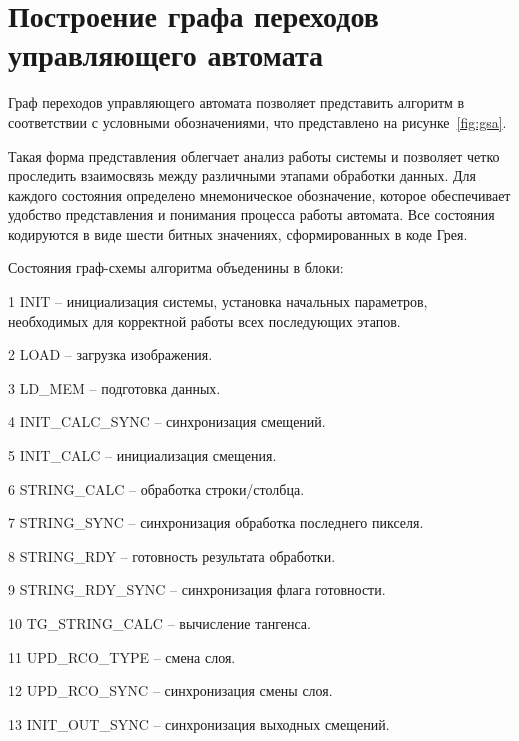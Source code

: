 


\section{Построение графа переходов управляющего автомата}

\hspace*{12.5 mm}Граф переходов управляющего автомата позволяет представить 
алгоритм в соответствии с условными обозначениями, что представлено 
на рисунке~\ref{fig:gsa}.


Такая форма 
представления облегчает анализ работы системы и позволяет четко проследить 
взаимосвязь между различными этапами обработки данных. 
Для каждого состояния определено мнемоническое обозначение, которое 
обеспечивает удобство представления и понимания процесса работы автомата. Все 
состояния кодируются в виде шести битных значениях, сформированных в коде Грея.

Состояния граф-схемы алгоритма объеденины в блоки:

  1 {INIT} – инициализация системы, установка начальных параметров, необходимых 
для корректной работы всех последующих этапов.

  2 {LOAD} – загрузка изображения.

  3 {LD\_MEM} – подготовка данных.

  4 {INIT\_CALC\_SYNC} – синхронизация смещений.

  5 {INIT\_CALC} – инициализация смещения.

  6 {STRING\_CALC} – обработка строки/столбца.

  7 {STRING\_SYNC} – синхронизация обработка последнего пикселя.

  8 {STRING\_RDY} – готовность результата обработки.

  9 {STRING\_RDY\_SYNC} – синхронизация флага готовности.

  10 {TG\_STRING\_CALC} – вычисление тангенса.

  11 {UPD\_RCO\_TYPE} – смена слоя.

  12 {UPD\_RCO\_SYNC} – синхронизация смены слоя.

  13 {INIT\_OUT\_SYNC} – синхронизация выходных смещений.

